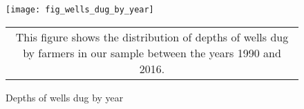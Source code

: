 \documentclass{article}
\numberwithin{table}{section}
\begin{document}
\renewcommand{\tabcolsep}{8pt}


\renewcommand{\tabcolsep}{10pt}


\renewcommand{\tabcolsep}{2pt}


\renewcommand{\tabcolsep}{8pt}




\clearpage

\begin{figure}[htbp]
	\centering\caption{Depths of wells dug by year\label{fig:wellsDugByYear}}
	\texttt{[image: fig\_wells\_dug\_by\_year]}
	\begin{tabular*}{1.0\hsize}{c}
		\multicolumn{1}{p{1.0\hsize}}{\footnotesize This figure shows the distribution of depths of wells dug by farmers in our sample between the years 1990 and 2016.}\\
	\end{tabular*}
\end{figure}




\end{document}
